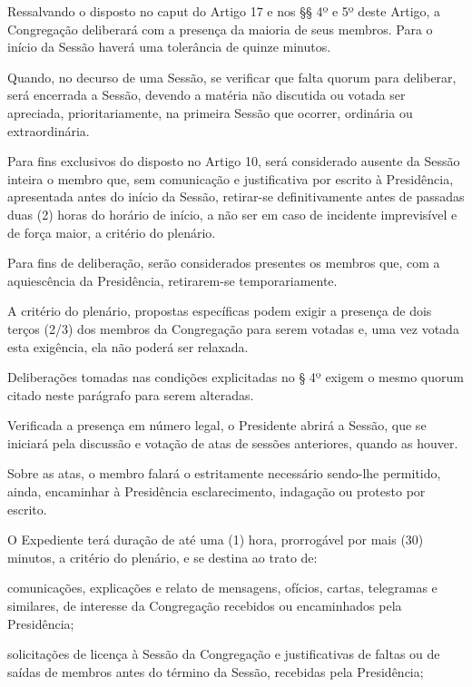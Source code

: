 \documentclass{documento}
\begin{document}
\artigo Ressalvando o disposto no caput do Artigo 17 e nos §§ 4º e 5º deste Artigo, a Congregação deliberará com a presença da maioria de seus membros. Para o início da Sessão haverá uma tolerância de quinze minutos.

\paragrafo Quando, no decurso de uma Sessão, se verificar que falta quorum para deliberar, será encerrada a Sessão, devendo a matéria não discutida ou votada ser apreciada, prioritariamente, na primeira Sessão que ocorrer, ordinária ou extraordinária.

\paragrafo Para fins exclusivos do disposto no Artigo 10, será considerado ausente da Sessão inteira o membro que, sem comunicação e justificativa por escrito à Presidência, apresentada antes do início da Sessão, retirar-se definitivamente antes de passadas duas (2) horas do horário de início, a não ser em caso de incidente imprevisível e de força maior, a critério do plenário.

\paragrafo Para fins de deliberação, serão considerados presentes os membros que, com a aquiescência da Presidência, retirarem-se temporariamente.

\paragrafo A critério do plenário, propostas específicas podem exigir a presença de dois terços (2/3) dos membros da Congregação para serem votadas e, uma vez votada esta exigência, ela não poderá ser relaxada.

\paragrafo Deliberações tomadas nas condições explicitadas no § 4º exigem o mesmo quorum citado neste parágrafo para serem alteradas.

\artigo Verificada a presença em número legal, o Presidente abrirá a Sessão, que se iniciará pela discussão e votação de atas de sessões anteriores, quando as houver.

\paragrafounico Sobre as atas, o membro falará o estritamente necessário sendo-lhe permitido, ainda, encaminhar à Presidência esclarecimento, indagação ou protesto por escrito.


\artigo O Expediente terá duração de até uma (1) hora, prorrogável por mais (30) minutos, a critério do plenário, e se destina ao trato de:

\inciso comunicações, explicações e relato de mensagens, ofícios, cartas, telegramas e similares, de interesse da Congregação recebidos ou encaminhados pela Presidência;

\inciso solicitações de licença à Sessão da Congregação e justificativas de faltas ou de saídas de membros antes do término da Sessão, recebidas pela Presidência;
\end{document}
